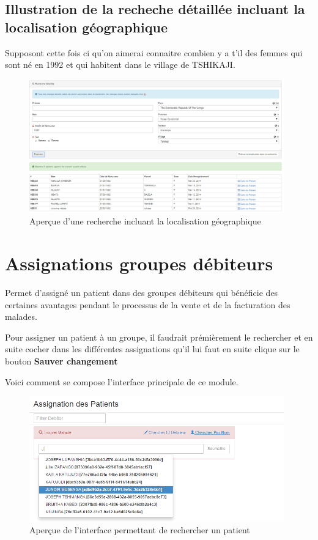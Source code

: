 \documentclass[12pt,a4paper]{report}
\begin{document}
\subsection{Illustration de la recheche détaillée incluant la localisation géographique}
Supposont cette fois ci qu'on aimerai connaitre combien y a t'il des femmes qui sont né en 1992 et qui habitent dans le village de TSHIKAJI.

\begin{figure}[h]
\begin{center}
\includegraphics[width=11cm]{pic/RechercheDetGeo.png}
\end{center}
\caption{Aperçue d'une recherche incluant la localisation géographique}
\label{Aperçue d'une recherche incluant la localisation géographique}
\end{figure} 
 
\newpage
\section{Assignations groupes débiteurs}
Permet d'assigné un patient dans des groupes débiteurs qui bénéficie des certaines avantages pendant le processus de la vente et de la facturation des malades.

Pour assigner un patient à un groupe, il faudrait prémièrement le rechercher et en suite cocher dans les différentes assignations qu'il lui faut en suite clique sur le bouton \textbf{Sauver changement}

Voici comment se compose l'interface principale de ce module.

\begin{figure}[h]
\begin{center}
\includegraphics[width=11cm]{pic/AssPatients.png}
\end{center}
\caption{Aperçue de l'interface permettant de rechercher un patient}
\label{Aperçue de l'interface permettant de rechercher un patient}
\end{figure} 
\end{document}
